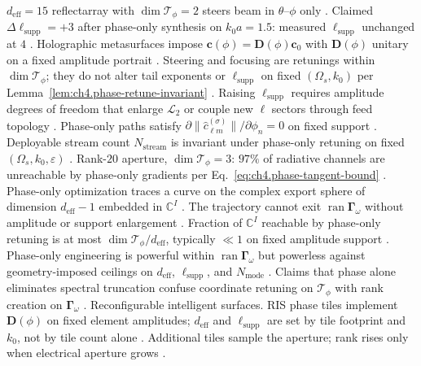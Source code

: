 \(d_{\mathrm{eff}}=15\) reflectarray with \(\dim\mathcal{T}_{\phi}=2\) steers beam in \(\theta\)--\(\phi\) only \cite{hansen1988}.
Claimed \(\Delta\ell_{\mathrm{supp}}=+3\) after phase-only synthesis on \(k_{0}a=1.5\): measured \(\ell_{\mathrm{supp}}\) unchanged at \(4\)
\cite{hansen1988}.
Holographic metasurfaces impose \(\mathbf{c}(\phi)=\mathbf{D}(\phi)\mathbf{c}_{0}\) with \(\mathbf{D}(\phi)\) unitary on a fixed amplitude portrait
\cite{stratton1941}. Steering and focusing are retunings within \(\dim\mathcal{T}_{\phi}\); they do not alter tail exponents or
\(\ell_{\mathrm{supp}}\) on fixed \((\Omega_{s},k_{0})\) per Lemma~\ref{lem:ch4.phase-retune-invariant} \cite{hansen1988}.
Raising \(\ell_{\mathrm{supp}}\) requires amplitude degrees of freedom that enlarge \(\mathcal{L}_{2}\) or couple new \(\ell\) sectors through feed topology
\cite{harrington2001}. Phase-only paths satisfy \(\partial\|\widehat{c}_{\ell m}^{(\sigma)}\|/\partial\phi_{n}=0\) on fixed support
\cite{hansen1988}.
\label{cor:ch4.phase-mimo-invariant}
Deployable stream count \(N_{\mathrm{stream}}\) is invariant under phase-only retuning on fixed \((\Omega_{s},k_{0},\varepsilon)\)
\cite{stratton1941}.
Rank-\(20\) aperture, \(\dim\mathcal{T}_{\phi}=3\): \(97\%\) of radiative channels are unreachable by phase-only gradients per
Eq.~\eqref{eq:ch4.phase-tangent-bound} \cite{stratton1941}.
Phase-only optimization traces a curve on the complex export sphere of dimension \(d_{\mathrm{eff}}-1\) embedded in \(\mathbb{C}^{I}\)
\cite{stratton1941}. The trajectory cannot exit \(\operatorname{ran}\boldsymbol{\Gamma}_\omega\) without amplitude or
support enlargement \cite{jackson1999}.
Fraction of \(\mathbb{C}^{I}\) reachable by phase-only retuning is at most \(\dim\mathcal{T}_{\phi}/d_{\mathrm{eff}}\), typically \(\ll1\) on fixed amplitude
support \cite{stratton1941}.
Phase-only engineering is powerful within \(\operatorname{ran}\boldsymbol{\Gamma}_\omega\) but powerless against geometry-imposed ceilings on
\(d_{\mathrm{eff}}\), \(\ell_{\mathrm{supp}}\), and \(N_{\mathrm{mode}}\) \cite{stratton1941}.
Claims that phase alone eliminates spectral truncation confuse coordinate retuning on \(\mathcal{T}_{\phi}\) with rank creation on \(\boldsymbol{\Gamma}_\omega\)
\cite{collin2001}.
Reconfigurable intelligent surfaces. RIS phase tiles implement \(\mathbf{D}(\phi)\) on fixed element amplitudes; \(d_{\mathrm{eff}}\) and \(\ell_{\mathrm{supp}}\) are set by tile footprint and \(k_{0}\),
not by tile count alone \cite{stratton1941}. Additional tiles sample the aperture; rank rises only when
electrical aperture grows \cite{harrington2001}.
